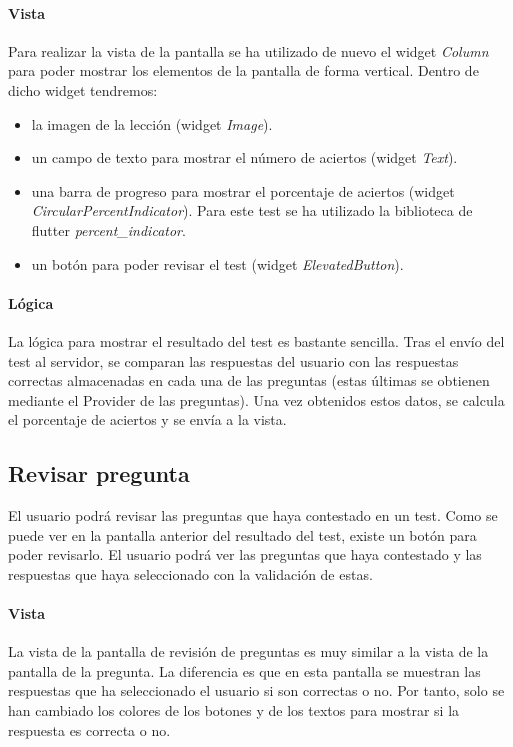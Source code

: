 \paragraph*{Vista}
\label{sec:vista}

Para realizar la vista de la pantalla se ha utilizado de nuevo el widget \textit{Column} para poder mostrar los elementos de la pantalla de forma vertical. 
Dentro de dicho widget tendremos:
\begin{itemize}
  \item la imagen de la lección (widget \textit{Image}).
  \item un campo de texto para mostrar el número de aciertos (widget \textit{Text}).
  \item una barra de progreso para mostrar el porcentaje de aciertos (widget \textit{CircularPercentIndicator}). Para este test se ha utilizado la biblioteca de flutter \textit{percent\_indicator}.
  \item un botón para poder revisar el test (widget \textit{ElevatedButton}).
\end{itemize}

\paragraph*{Lógica}
\label{sec:logica}
La lógica para mostrar el resultado del test es bastante sencilla.
Tras el envío del test al servidor, se comparan las respuestas del usuario con las respuestas correctas almacenadas en cada una de las preguntas (estas últimas se obtienen mediante el Provider de las preguntas). 
Una vez obtenidos estos datos, se calcula el porcentaje de aciertos y se envía a la vista.



\subsection{Revisar pregunta}
\label{sec:pregunta}
El usuario podrá revisar las preguntas que haya contestado en un test. Como se puede ver en la pantalla anterior del resultado del test, existe un botón para poder revisarlo. El usuario podrá ver las preguntas que haya contestado y las respuestas que haya seleccionado con la validación de estas.

\paragraph*{Vista}
\label{sec:vista}
La vista de la pantalla de revisión de preguntas es muy similar a la vista de la pantalla de la pregunta. La diferencia es que en esta pantalla se muestran las respuestas que ha seleccionado el usuario si son correctas o no.
Por tanto, solo se han cambiado los colores de los botones y de los textos para mostrar si la respuesta es correcta o no.

